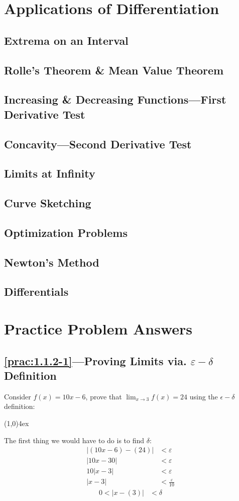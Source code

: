 \documentclass{MathNotes}
\newcommand{\br}{
\begin{center}
\line(1,0){4ex}
\end{center}}
\begin{document}
\section{Applications of Differentiation}
\subsection{Extrema on an Interval}
\subsection{Rolle's Theorem \& Mean Value Theorem}
\subsection{Increasing \& Decreasing Functions---First Derivative Test}
\subsection{Concavity---Second Derivative Test}
\subsection{Limits at Infinity}
\subsection{Curve Sketching}
\subsection{Optimization Problems}
\subsection{Newton's Method}
\subsection{Differentials}


\newpage
\section{Practice Problem Answers}

\subsection*{\ref{prac:1.1.2-1}---Proving Limits via. $\varepsilon-\delta$ Definition}
\label{ans:1.1.2-1}
Consider $f(x)=10x-6$, prove that $\displaystyle\lim_{x\to 3}f(x)=24$ using the 
$\epsilon-\delta$ definition:
\br
The first thing we would have to do is to find $\delta$:
\begin{align*}
    \lvert (10x-6)-(24) \rvert &<\varepsilon  \\
    \lvert 10x-30 \rvert &<\varepsilon \\
    10\lvert x-3 \rvert &<\varepsilon \\
    \lvert x-3 \rvert &<\frac{\varepsilon}{10}
\end{align*}
\begin{align*}
    0 < \lvert x - (3)\rvert &< \delta
\end{align*}
\end{document}
